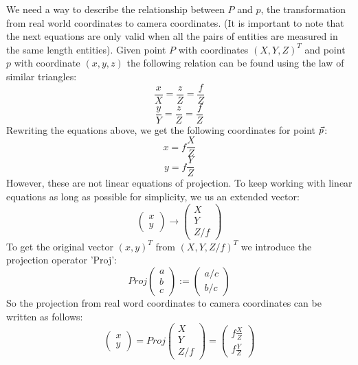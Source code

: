 We need a way to describe the relationship between $P$ and $p$, the transformation from real world coordinates to camera coordinates. (It is important to note that the next equations are only valid when all the pairs of entities are measured in the same length entities). Given point $P$ with coordinates $(X, Y, Z)^T$ and point $p$ with coordinate $(x, y, z)$ the following relation can be found using the law of similar triangles: 
\begin{equation}
    \frac{x}{X} = \frac{z}{Z} = \frac{f}{Z}
\end{equation}
\begin{equation}
    \frac{y}{Y} = \frac{z}{Z} = \frac{f}{Z}
\end{equation}
Rewriting the equations above, we get the following coordinates for point $\vec p$:
\begin{equation}\label{eq:im_proj1}
    x = f\frac{X}{Z}
\end{equation}
\begin{equation}\label{eq:im_proj2}
    y = f\frac{Y}{Z}
\end{equation}
However, these are not linear equations of projection. To keep working with linear equations as long as possible for simplicity, we us an extended vector: 
\begin{equation}\label{eq:exvec}
    \begin{pmatrix}
        x \\ y
    \end{pmatrix} \rightarrow 
    \begin{pmatrix}
        X \\ Y \\ Z/f
    \end{pmatrix}
\end{equation}
To get the original vector $(x, y)^T$ from $(X, Y, Z/f)^T$ we introduce the projection operator 'Proj':
\begin{equation}
    Proj\begin{pmatrix}
        a \\ b \\ c
    \end{pmatrix} :=
    \begin{pmatrix}
        a/c \\ b/c
    \end{pmatrix}
\end{equation}
So the projection from real word coordinates to camera coordinates can be written as follows:
\begin{equation}\label{eq:projection}
    \begin{pmatrix}
        x \\ y
    \end{pmatrix} = Proj
    \begin{pmatrix}
        X \\ Y \\ Z/f
    \end{pmatrix} = 
    \begin{pmatrix}
        f\frac{X}{Z} \\[0.25cm] f\frac{Y}{Z}
    \end{pmatrix}
\end{equation}

